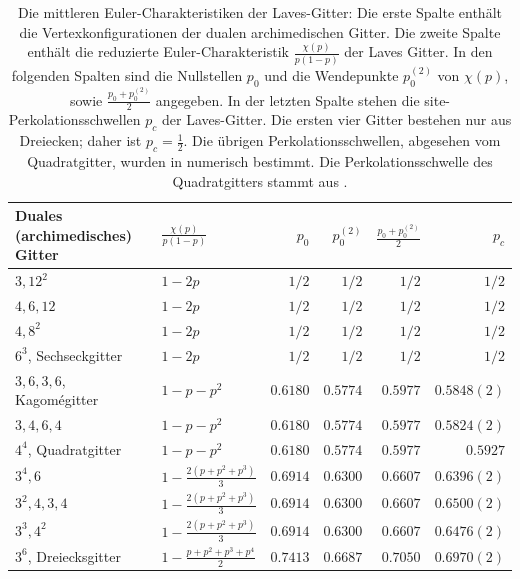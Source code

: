 \begin{table}[tb]
\centering
\begin{tabular}{|l|l||r|r|r||r|}
\hline
Duales (archimedisches) Gitter & $\frac{\chi(p)}{p(1-p)}$ & $p_0$ & $p_0^{(2)}$&$\frac{p_0+p_0^{(2)}}{2}$&$p_c$  \\ \hline
\hline

$3,12^2$ &$1-2p$&$1/2$ & $1/2$&$1/2$&$1/2$\\ \hline
 
$4,6,12$ &$1-2p$&$1/2$ & $1/2$&$1/2$&$1/2$\\ \hline

$4,8^2$&$1-2p$&$1/2$ & $1/2$&$1/2$&$1/2$\\ \hline

$6^3$, Sechseckgitter &$1-2p$&$1/2 $ & $1/2$&$1/2$&$1/2$\\ \hline

$3,6,3,6$, Kagom\'egitter&$1-p-p^2$&$0.6180$ & $0.5774$&$0.5977$&$0.5848(2)$ \\ \hline

$3,4,6,4$ &$1-p-p^2$&$0.6180$ & $0.5774$&$0.5977$&$0.5824(2)$ \\ \hline

$4^4$, Quadratgitter&$1-p-p^2$&$0.6180$ & $0.5774$&$0.5977$&$0.5927$ \\ \hline

$3^4,6$ &$1-\frac{2(p+p^2+p^3)}{3}$&$0.6914$ & $0.6300$&$0.6607$& $0.6396(2)$ \\ \hline

$3^2,4,3,4$ &$1-\frac{2(p+p^2+p^3)}{3}$&$0.6914$ & $0.6300$&$0.6607$&$0.6500(2)$  \\ \hline

$3^3,4^2$ &$1-\frac{2(p+p^2+p^3)}{3}$&$0.6914$& $0.6300$&$0.6607$&$0.6476(2)$  \\ \hline

$3^6$, Dreiecksgitter&$1-\frac{p+p^2+p^3+p^4}{2} $&$0.7413$ & $0.6687$&$0.7050$&$0.6970(2)$ \\ \hline

 \hline

\end{tabular}
\caption{Die mittleren Euler-Charakteristiken der Laves-Gitter: Die erste Spalte enth\"alt die Vertexkonfigurationen der dualen archimedischen Gitter. Die zweite Spalte enth\"alt die reduzierte Euler-Charakteristik $\frac{\chi(p)}{p(1-p)}$ der Laves Gitter. In den folgenden Spalten sind die Nullstellen $p_0$ und die Wendepunkte $p_0^{(2)}$ von $\chi(p)$, sowie $\frac{p_0+p_0^{(2)}}{2}$ angegeben. In der letzten Spalte stehen die site-Perkolationsschwellen $p_c$ der Laves-Gitter. Die ersten vier Gitter bestehen nur aus Dreiecken; daher ist $p_c=\frac{1}{2}$. Die \"ubrigen Perkolationsschwellen, abgesehen vom Quadratgitter, wurden in \cite{Marck:03} numerisch bestimmt. Die Perkolationsschwelle des Quadratgitters stammt aus \cite{Suding:99}.}
\label{tab:laves}
\end{table}

